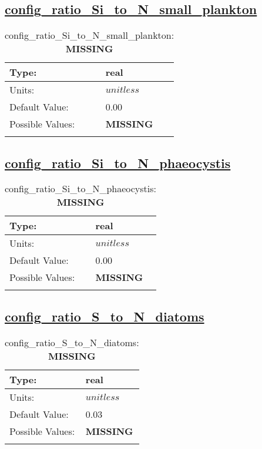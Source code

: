 \subsection[config\_ratio\_Si\_to\_N\_small\_plankton]{\hyperref[sec:nm_tab_biogeochemistry]{config\_ratio\_Si\_to\_N\_small\_plankton}}
\label{subsec:nm_sec_config_ratio_Si_to_N_small_plankton}
\begin{center}
\begin{longtable}{| p{2.0in} || p{4.0in} |}
    \hline
    Type: & real \\
    \hline
    Units: & $unitless$ \\
    \hline
    Default Value: & 0.00 \\
    \hline
    Possible Values: & {\bf \color{red} MISSING} \\
    \hline
    \caption{config\_ratio\_Si\_to\_N\_small\_plankton: {\bf \color{red} MISSING}}
\end{longtable}
\end{center}
\subsection[config\_ratio\_Si\_to\_N\_phaeocystis]{\hyperref[sec:nm_tab_biogeochemistry]{config\_ratio\_Si\_to\_N\_phaeocystis}}
\label{subsec:nm_sec_config_ratio_Si_to_N_phaeocystis}
\begin{center}
\begin{longtable}{| p{2.0in} || p{4.0in} |}
    \hline
    Type: & real \\
    \hline
    Units: & $unitless$ \\
    \hline
    Default Value: & 0.00 \\
    \hline
    Possible Values: & {\bf \color{red} MISSING} \\
    \hline
    \caption{config\_ratio\_Si\_to\_N\_phaeocystis: {\bf \color{red} MISSING}}
\end{longtable}
\end{center}
\subsection[config\_ratio\_S\_to\_N\_diatoms]{\hyperref[sec:nm_tab_biogeochemistry]{config\_ratio\_S\_to\_N\_diatoms}}
\label{subsec:nm_sec_config_ratio_S_to_N_diatoms}
\begin{center}
\begin{longtable}{| p{2.0in} || p{4.0in} |}
    \hline
    Type: & real \\
    \hline
    Units: & $unitless$ \\
    \hline
    Default Value: & 0.03 \\
    \hline
    Possible Values: & {\bf \color{red} MISSING} \\
    \hline
    \caption{config\_ratio\_S\_to\_N\_diatoms: {\bf \color{red} MISSING}}
\end{longtable}
\end{center}
